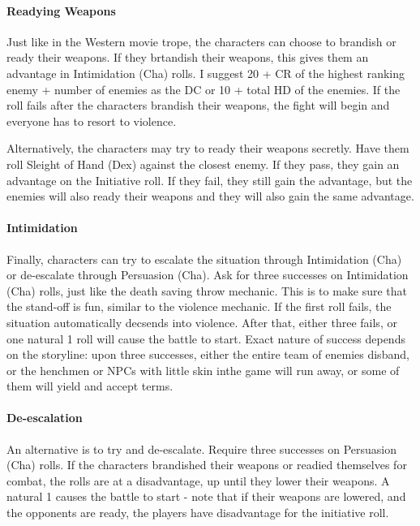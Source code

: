 \documentclass[twocolumn]{dndbook}
\begin{document}
\paragraph*{Readying Weapons}
Just like in the Western movie trope, the characters can choose to brandish or ready their weapons.
If they brtandish their weapons, this gives them an advantage in Intimidation (Cha) rolls.
I suggest 20 + CR of the highest ranking enemy + number of enemies as the DC or 10 + total HD of the enemies.
If the roll fails after the characters brandish their weapons, the fight will begin and everyone has to resort to violence.\par

Alternatively, the characters may try to ready their weapons secretly.
Have them roll Sleight of Hand (Dex) against the closest enemy.
If they pass, they gain an advantage on the Initiative roll.
If they fail, they still gain the advantage, but the enemies will also ready their weapons and they will also gain the same advantage.\par

\paragraph*{Intimidation}
Finally, characters can try to escalate the situation through Intimidation (Cha) or de-escalate through Persuasion (Cha).
Ask for three successes on Intimidation (Cha) rolls, just like the death saving throw mechanic.
This is to make sure that the stand-off is fun, similar to the violence mechanic.
If the first roll fails, the situation automatically decsends into violence.
After that, either three fails, or one natural 1 roll will cause the battle to start.
Exact nature of success depends on the storyline:
upon three successes, either the entire team of enemies disband, or the henchmen or NPCs with little skin inthe game will run away, or some of them will yield and accept terms.\par

\paragraph*{De-escalation}
An alternative is to try and de-escalate.
Require three successes on Persuasion (Cha) rolls.
If the characters brandished their weapons or readied themselves for combat, the rolls are at a disadvantage, up until they lower their weapons.
A natural 1 causes the battle to start - note that if their weapons are lowered, and the opponents are ready, the players have disadvantage for the initiative roll.
\par
\end{document}
